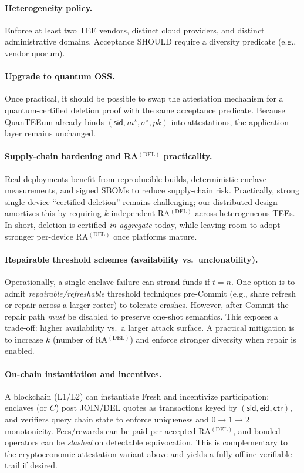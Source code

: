 \documentclass[runningheads,orivec]{llncs}
\newcommand{\prot}{\textsf{QuanTEEum}}
\newcommand{\sid}{\mathsf{sid}}
\begin{document}
\paragraph{Heterogeneity policy.}
Enforce at least two TEE vendors, distinct cloud providers, and distinct administrative domains. Acceptance SHOULD require a diversity predicate (e.g., vendor quorum).

\paragraph{Upgrade to quantum OSS.}
Once practical, it should be possible to swap the attestation mechanism for a quantum-certified deletion proof with the same acceptance predicate. Because \prot{} already binds $(\mathsf{sid},m^{\star},\sigma^{\star},pk)$ into attestations, the application layer remains unchanged.

\paragraph{Supply-chain hardening and RA$^{(\mathrm{DEL})}$ practicality.}
Real deployments benefit from reproducible builds, deterministic enclave measurements, and signed SBOMs to reduce supply-chain risk. Practically, strong single-device “certified deletion” remains challenging; our distributed design amortizes this by requiring $k$ independent RA$^{(\mathrm{DEL})}$ across heterogeneous TEEs. In short, deletion is certified \emph{in aggregate} today, while leaving room to adopt stronger per-device RA$^{(\mathrm{DEL})}$ once platforms mature.

\paragraph{Repairable threshold schemes (availability vs.\ unclonability).}
Operationally, a single enclave failure can strand funds if $t\!=\!n$. One option is to admit \emph{repairable/refreshable} threshold techniques pre\mbox{-}Commit (e.g., share refresh or repair across a larger roster) to tolerate crashes. However, after Commit the repair path \emph{must} be disabled to preserve one\mbox{-}shot semantics. This exposes a trade-off: higher availability vs.\ a larger attack surface. A practical mitigation is to increase $k$ (number of RA$^{(\mathrm{DEL})}$) and enforce stronger diversity when repair is enabled.

\paragraph{On-chain instantiation and incentives.}
A blockchain (L1/L2) can instantiate \textsf{Fresh} and incentivize participation: enclaves (or $C$) post JOIN/DEL quotes as transactions keyed by $(\sid,\mathsf{eid},\mathsf{ctr})$, and verifiers query chain state to enforce uniqueness and $0\!\rightarrow\!1\!\rightarrow\!2$ monotonicity. Fees/rewards can be paid per accepted RA$^{(\mathrm{DEL})}$, and bonded operators can be \emph{slashed} on detectable equivocation. This is complementary to the cryptoeconomic attestation variant above and yields a fully offline-verifiable trail if desired.
\end{document}
